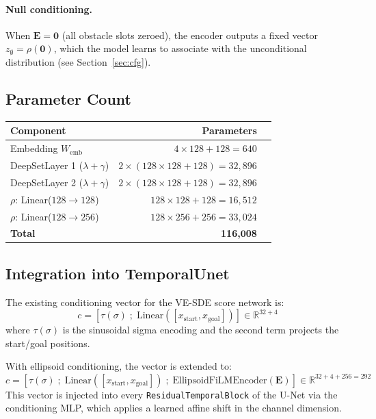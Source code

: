 \documentclass{article}
\newcommand{\R}{\mathbb{R}}
\begin{document}
\paragraph{Null conditioning.}
When $\mathbf{E} = \mathbf{0}$ (all obstacle slots zeroed), the encoder outputs
a fixed vector $z_\emptyset = \rho(\mathbf{0})$, which the model learns to
associate with the unconditional distribution (see Section~\ref{sec:cfg}).

\subsection{Parameter Count}

\begin{center}
\begin{tabular}{lrr}
\toprule
Component & Parameters \\
\midrule
Embedding $W_{\mathrm{emb}}$ & $4 \times 128 + 128 = 640$ \\
DeepSetLayer 1 ($\lambda + \gamma$) & $2 \times (128 \times 128 + 128) = 32{,}896$ \\
DeepSetLayer 2 ($\lambda + \gamma$) & $2 \times (128 \times 128 + 128) = 32{,}896$ \\
$\rho$: Linear($128 \to 128$) & $128 \times 128 + 128 = 16{,}512$ \\
$\rho$: Linear($128 \to 256$) & $128 \times 256 + 256 = 33{,}024$ \\
\midrule
\textbf{Total} & \textbf{116,}$\mathbf{0}$\textbf{08} \\
\bottomrule
\end{tabular}
\end{center}

\subsection{Integration into TemporalUnet}

The existing conditioning vector for the VE-SDE score network is:
\begin{equation}
    c = \left[\tau(\sigma)\;;\; \mathrm{Linear}([x_{\mathrm{start}}, x_{\mathrm{goal}}])\right]
    \in \R^{32 + 4}
\end{equation}
where $\tau(\sigma)$ is the sinusoidal sigma encoding and the second term
projects the start/goal positions.

With ellipsoid conditioning, the vector is extended to:
\begin{equation}
\boxed{
    c = \left[\tau(\sigma)\;;\; \mathrm{Linear}([x_{\mathrm{start}}, x_{\mathrm{goal}}])\;;\;
              \mathrm{EllipsoidFiLMEncoder}(\mathbf{E})\right]
    \in \R^{32 + 4 + 256 = 292}
}
\end{equation}
This vector is injected into every \texttt{ResidualTemporalBlock} of the U-Net
via the conditioning MLP, which applies a learned affine shift in the channel
dimension.
\end{document}
